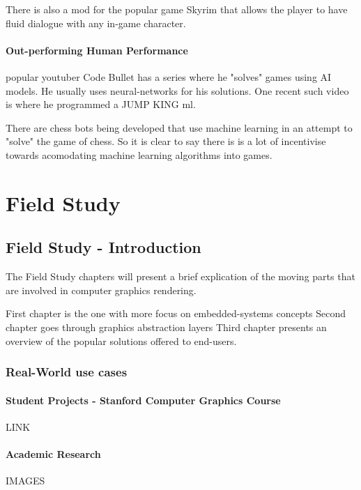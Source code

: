                 There is also a mod for the popular game Skyrim that allows the player to have fluid dialogue with any in-game character. 
        
        \subsection{Out-performing Human Performance}
            popular youtuber Code Bullet has a series where he "solves" games using AI models. He usually uses neural-networks for his solutions. One recent such video is where he programmed a JUMP KING ml.
            
            There are chess bots being developed that use machine learning in an attempt to "solve" the game of chess. So it is clear to say there is is a lot of incentivise towards acomodating machine learning algorithms into games.



\part*{Field Study}

\chapter*{Field Study - Introduction}
    The Field Study chapters will present a brief explication of the moving parts that are involved in computer graphics rendering.

    First chapter is the one with more focus on embedded-systems concepts 
    Second chapter goes through graphics abstraction layers 
    Third chapter presents an overview of the popular solutions offered to end-users. 


    \section*{Real-World use cases}
        \subsection*{Student Projects - Stanford Computer Graphics Course}
            LINK
        \subsection*{Academic Research}
            IMAGES


